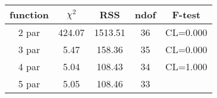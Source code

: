 \begin{tabular}{c|c|c|c|c}
function & $\chi^2$ & RSS & ndof & F-test \\
\hline
2 par & 424.07 & 1513.51 & 36 & CL=0.000 \\
3 par & 5.47 & 158.36 & 35 & CL=0.000 \\
4 par & 5.04 & 108.43 & 34 & CL=1.000 \\
5 par & 5.05 & 108.46 & 33 & \\
\hline
\end{tabular}